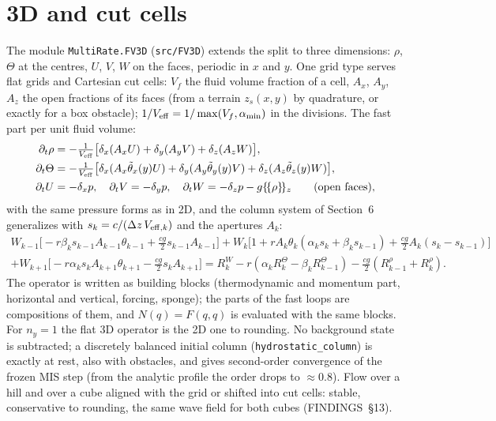 \documentclass[11pt,a4paper]{article}
\newcommand{\avg}[1]{\{\!\{#1\}\!\}}
\newcommand{\code}[1]{\texttt{#1}}
\begin{document}
\section{3D and cut cells}\label{sec:3d}
The module \code{MultiRate.FV3D} (\code{src/FV3D}) extends the split to three dimensions: $\rho$, $\Theta$ at the
centres, $U$, $V$, $W$ on the faces, periodic in $x$ and $y$. One grid type serves flat grids and Cartesian
cut cells: $V_f$ the fluid volume fraction of a cell, $A_x$, $A_y$, $A_z$ the open fractions of its faces (from a
terrain $z_s(x,y)$ by quadrature, or exactly for a box obstacle); $1/V_{\rm eff}=1/\max(V_f,\alpha_{\min})$ in the
divisions. The fast part per unit fluid volume:
\begin{align*}
\partial_t\rho&=-\tfrac1{V_{\rm eff}}\big[\delta_x(A_xU)+\delta_y(A_yV)+\delta_z(A_zW)\big],\\
\partial_t\Theta&=-\tfrac1{V_{\rm eff}}\big[\delta_x(A_x\tilde\theta_x(y)U)+\delta_y(A_y\tilde\theta_y(y)V)+\delta_z(A_z\tilde\theta_z(y)W)\big],\\
\partial_tU&=-\delta_xp,\quad\partial_tV=-\delta_yp,\quad\partial_tW=-\delta_zp-g\avg\rho_z\qquad(\text{open faces}),
\end{align*}
with the same pressure forms as in 2D, and the column system of Section~6 generalizes with
$s_k=c/(\Delta z\,V_{{\rm eff},k})$ and the apertures $A_k$:
\begin{multline*}
W_{k-1}\big[-r\beta_ks_{k-1}A_{k-1}\theta_{k-1}+\tfrac{cg}2s_{k-1}A_{k-1}\big]
+W_k\big[1+rA_k\theta_k(\alpha_ks_k+\beta_ks_{k-1})+\tfrac{cg}2A_k(s_k-s_{k-1})\big]\\
+W_{k+1}\big[-r\alpha_ks_kA_{k+1}\theta_{k+1}-\tfrac{cg}2s_kA_{k+1}\big]
=R^W_k-r(\alpha_kR^\Theta_k-\beta_kR^\Theta_{k-1})-\tfrac{cg}2(R^\rho_{k-1}+R^\rho_k).
\end{multline*}
The operator is written as building blocks (thermodynamic and momentum part, horizontal and vertical,
forcing, sponge); the parts of the fast loops are compositions of them, and $N(q)=F(q,q)$ is evaluated with
the same blocks. For $n_y=1$ the flat 3D operator is the 2D one to rounding. No background state is
subtracted; a discretely balanced initial column (\code{hydrostatic\_column}) is exactly at rest, also
with obstacles, and gives second-order convergence of the frozen MIS step (from the analytic profile the
order drops to $\approx0.8$). Flow over a hill and over a cube aligned with the grid or shifted into cut cells:
stable, conservative to rounding, the same wave field for both cubes (FINDINGS~\S13).
\end{document}
